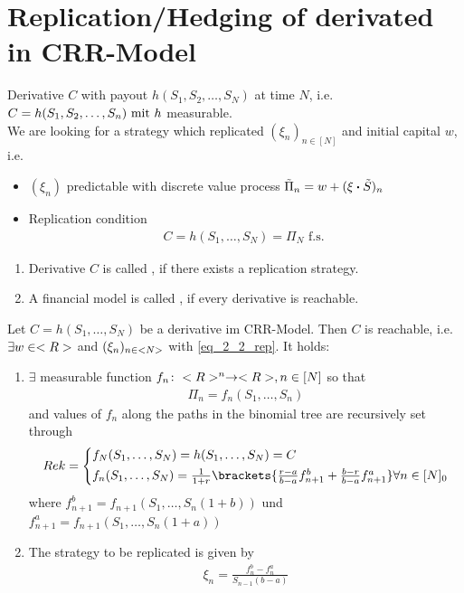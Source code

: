 \section{Replication/Hedging of derivated in CRR-Model}
Derivative $C$ with payout $h(S_1, S_2, \dots, S_N)$ at time $N$, i.e. $C = h(S_1, S_2, \dots, S_n) \mit h$ measurable.\\
We are looking for a strategy which replicated $(\xi_n)_{n \in [N]}$ and initial capital $w$, i.e.
\begin{itemize}
	\item $(\xi_n)$ predictable with discrete value process $\tilde{\Pi}_n = w + (\xi \bigcdot \tilde{S})_n$
	\item Replication condition
	\begin{align*}
		C = h(S_1, \dots, S_N) = \Pi_N \text{   f.s. } \tag{Rep}\label{eq_2_2_rep}
	\end{align*}
\end{itemize}
\begin{definition}
	\begin{enumerate}
		\item Derivative $C$ is called , if there exists a replication strategy.
		\item A financial model is called , if every derivative is reachable. 
	\end{enumerate}
\end{definition}
\begin{theorem} %
	Let $C = h(S_1, \dots, S_N)$ be a derivative im CRR-Model. Then $C$ is reachable, i.e. $\exists w \in \R$ and $(\xi_n)_{n \in \N}$ with \eqref{eq_2_2_rep}. It holds:
	\begin{enumerate}
		\item $\exists$ measurable function $f_n \colon \R^n \to \R, n \in [N]$ so that
		\begin{align*}
			\Pi_n = f_n(S_1, \dots, S_n)
		\end{align*}
		and values of $f_n$ along the paths in the binomial tree are recursively set through
		\begin{align*}
			Rek = \begin{cases*}
				f_N(S_1, \dots, S_N) = h(S_1, \dots, S_N) = C\\
				f_n(S_1, \dots, S_N) = \frac{1}{1+r}\brackets{\frac{r-a}{b-a} f^b_{n+1} + \frac{b-r}{b-a}f^a_{n+1}} \forall n \in [N]_0
			\end{cases*}
		\end{align*}
		where $f^b_{n+1} = f_{n+1}(S_1, \dots, S_n(1+b))$ und $f^a_{n+1} = f_{n+1}(S_1, \dots, S_n(1+a))$
		\item The strategy to be replicated is given by 
		\begin{align*}
			\xi_n = \frac{f^b_n - f^a_n}{S_{n-1}(b-a)} \tag{$\Delta$-Hedge}\label{eq_2_3_hedge}
		\end{align*}
	\end{enumerate}
\end{theorem}

